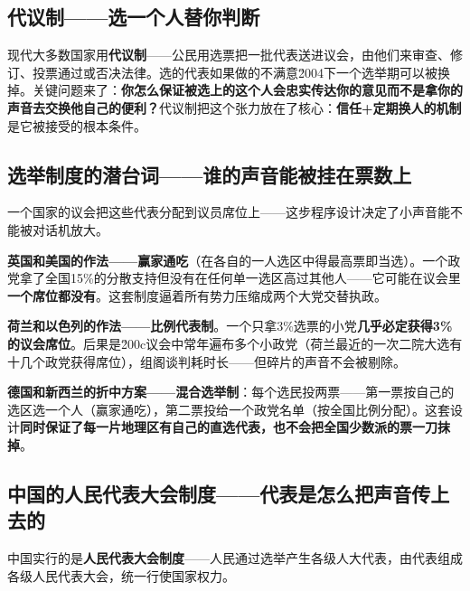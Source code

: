 \documentclass[a4paper,12pt]{ctexart}
\begin{document}
\subsection*{代议制——选一个人替你判断}

现代大多数国家用\textbf{代议制}——公民用选票把一批代表送进议会，由他们来审查、修订、投票通过或否决法律。选的代表如果做的不满意\u2004下一个选举期可以被换掉。关键问题来了：\textbf{你怎么保证被选上的这个人会忠实传达你的意见而不是拿你的声音去交换他自己的便利？}代议制把这个张力放在了核心：\textbf{信任+定期换人的机制}是它被接受的根本条件。

\subsection*{选举制度的潜台词——谁的声音能被挂在票数上}

一个国家的议会把这些代表分配到议员席位上——这步程序设计决定了小声音能不能被对话机放大。

\textbf{英国和美国的作法——赢家通吃}（在各自的一人选区中得最高票即当选）。一个政党拿了全国15\%的分散支持但没有在任何单一选区高过其他人——它可能在议会里\textbf{一个席位都没有}。这套制度逼着所有势力压缩成两个大党交替执政。

\textbf{荷兰和以色列的作法——比例代表制}。一个只拿3\%选票的小党\textbf{几乎必定获得3\%的议会席位}。后果是\u200c议会中常年遍布多个小政党（荷兰最近的一次二院大选有十几个政党获得席位），组阁谈判耗时长——但碎片的声音不会被剔除。

\textbf{德国和新西兰的折中方案——混合选举制}：每个选民投两票——第一票按自己的选区选一个人（赢家通吃），第二票投给一个政党名单（按全国比例分配）。这套设计\textbf{同时保证了每一片地理区有自己的直选代表，也不会把全国少数派的票一刀抹掉}。


\subsection*{中国的人民代表大会制度——代表是怎么把声音传上去的}

中国实行的是\textbf{人民代表大会制度}——人民通过选举产生各级人大代表，由代表组成各级人民代表大会，统一行使国家权力。
\end{document}
